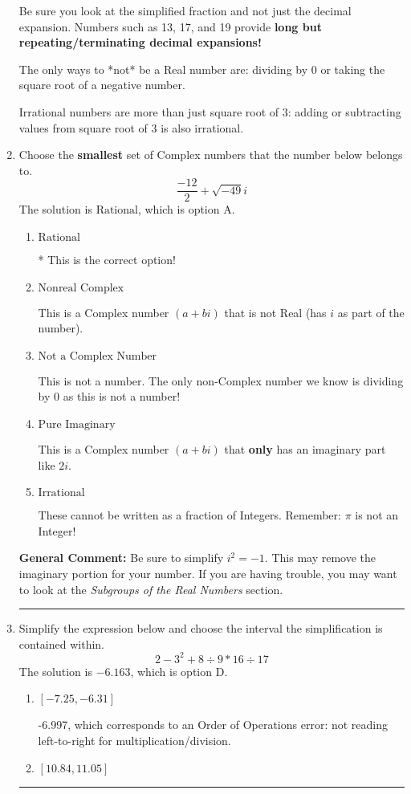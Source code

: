 \documentclass{extbook}[14pt]
\newcommand{\litem}[1]{\item #1

\rule{\textwidth}{0.4pt}}
\begin{document}
\begin{enumerate}
{ Be sure you look at the simplified fraction and not just the decimal expansion. Numbers such as 13, 17, and 19 provide \textbf{long but repeating/terminating decimal expansions!} 
 
 The only ways to *not* be a Real number are: dividing by 0 or taking the square root of a negative number. 
 
 Irrational numbers are more than just square root of 3: adding or subtracting values from square root of 3 is also irrational.
}
\litem{
Choose the \textbf{smallest} set of Complex numbers that the number below belongs to.
\[ \frac{-12}{2}+\sqrt{-49}i \]The solution is \( \text{Rational} \), which is option A.\begin{enumerate}[label=\Alph*.]
\item \( \text{Rational} \)

* This is the correct option!
\item \( \text{Nonreal Complex} \)

This is a Complex number $(a+bi)$ that is not Real (has $i$ as part of the number).
\item \( \text{Not a Complex Number} \)

This is not a number. The only non-Complex number we know is dividing by 0 as this is not a number!
\item \( \text{Pure Imaginary} \)

This is a Complex number $(a+bi)$ that \textbf{only} has an imaginary part like $2i$.
\item \( \text{Irrational} \)

These cannot be written as a fraction of Integers. Remember: $\pi$ is not an Integer!
\end{enumerate}

\textbf{General Comment:} Be sure to simplify $i^2 = -1$. This may remove the imaginary portion for your number. If you are having trouble, you may want to look at the \textit{Subgroups of the Real Numbers} section.
}
\litem{
Simplify the expression below and choose the interval the simplification is contained within.
\[ 2 - 3^2 + 8 \div 9 * 16 \div 17 \]The solution is \( -6.163 \), which is option D.\begin{enumerate}[label=\Alph*.]
\item \( [-7.25, -6.31] \)

 -6.997, which corresponds to an Order of Operations error: not reading left-to-right for multiplication/division.
\item \( [10.84, 11.05] \)


\end{enumerate}}
\end{enumerate}
\end{document}
